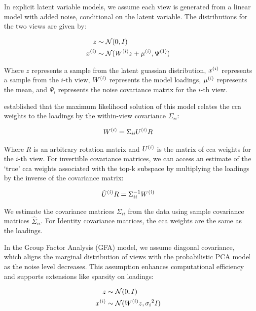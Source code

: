 In explicit latent variable models, we assume each view is generated from a linear model with added noise, conditional on the latent variable.
The distributions for the two views are given by:

\begin{align}
    z &\sim \mathcal{N}(0, I)\\
    x^{(i)} &\sim \mathcal{N}(W^{(i)} z + \mu^{(i)}, \Psi^{(1)})
\end{align}

Where \(z\) represents a sample from the latent guassian distribution, \(x^{(i)}\) represents a sample from the \(i\)-th view, \(W^{(i)}\) represents the model loadings, \(\mu^{(i)}\) represents the mean, and \(\Psi_{i}\) represents the noise covariance matrix for the \(i\)-th view.

\citet{bach2005probabilistic} established that the maximum likelihood solution of this model relates the \acrshort{cca} weights to the loadings by the within-view covariance \(\Sigma_{ii}\):

\begin{align}\label{eq:weights-to-loadings}
    W^{(i)} = \Sigma_{ii} U^{(i)} R
\end{align}

Where \(R\) is an arbitrary rotation matrix and \(U^{(i)}\) is the matrix of \acrshort{cca} weights for the \(i\)-th view.
For invertible covariance matrices, we can access an estimate of the `true' \acrshort{cca} weights associated with the top-k subspace by multiplying the loadings by the inverse of the covariance matrix:

\begin{align}\label{eq:loadings-to-weights}
    \hat{U}^{(i)}R = \Sigma_{ii}^{-1} W^{(i)}
\end{align}

We estimate the covariance matrices \(\Sigma_{ii}\) from the data using sample covariance matrices \(\hat{\Sigma}_{ii}\).
For Identity covariance matrices, the \acrshort{cca} weights are the same as the loadings.

In the Group Factor Analysis (GFA) model, we assume diagonal covariance, which aligns the marginal distribution of views with the probabilistic PCA model as the noise level decreases.
This assumption enhances computational efficiency and supports extensions like sparsity on loadings:

\begin{align}
    z &\sim \mathcal{N}(0, I)\\
    x^{(i)} &\sim \mathcal{N}(W^{(i)} z, {\sigma_{i}}^{2}I)
\end{align}


